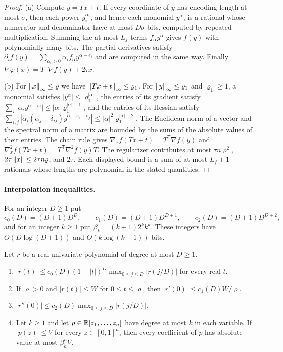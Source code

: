 \begin{proof}
(a) Compute $y=Tx+t$. If every coordinate of $y$ has encoding length at most
$\sigma$, then each power $y_i^{\alpha_i}$, and hence each monomial
$y^\alpha$, is a rational whose numerator and denominator have at most
$D\sigma$ bits, computed by repeated multiplication. Summing the at most
$L_f$ terms $f_\alpha y^\alpha$ gives $f(y)$ with polynomially many bits.
The partial derivatives satisfy
$\partial_if(y)=\sum_{\alpha_i>0}\alpha_if_\alpha y^{\alpha-e_i}$ and are
computed in the same way. Finally
$\nabla\varphi(x)=T^{\mathsf T}\nabla f(y)+2\tau x$.

(b) For $\left\lVert x\right\rVert_\infty\le\varrho$ we have
$\left\lVert Tx+t\right\rVert_\infty\le\varrho_1$. For $\left\lVert y\right\rVert_\infty\le\varrho_1$ and
$\varrho_1\ge1$, a monomial satisfies $|y^\alpha|\le\varrho_1^{|\alpha|}$,
the entries of its gradient satisfy
$\sum_i|\alpha_iy^{\alpha-e_i}|\le|\alpha|\varrho_1^{|\alpha|-1}$, and
the entries of its Hessian satisfy
$\sum_{i,j}|\alpha_i(\alpha_j-\delta_{ij})y^{\alpha-e_i-e_j}|\le
|\alpha|^2\varrho_1^{|\alpha|-2}$. The Euclidean norm of a vector and the
spectral norm of a matrix are bounded by the sums of the absolute values of
their entries. The chain rule gives
$\nabla_x f(Tx+t)=T^{\mathsf T}\nabla f(y)$ and
$\nabla^2_xf(Tx+t)=T^{\mathsf T}\nabla^2f(y)T$. The regularizer contributes
at most $\tau n\varrho^2$, $2\tau\left\lVert x\right\rVert\le2\tau n\varrho$, and $2\tau$.
Each displayed bound is a sum of at most $L_f+1$ rationals whose lengths
are polynomial in the stated quantities.
\end{proof}

\paragraph{Interpolation inequalities.}
For an integer $D\ge1$ put
\[
 c_0(D)=(D+1)D^D,\qquad c_1(D)=(D+1)D^{D+1},\qquad c_2(D)=(D+1)D^{D+2},
\]
and for an integer $k\ge1$ put $\beta_k=(k+1)2^kk^k$. These integers have
$O(D\log(D+1))$ and $O(k\log(k+1))$ bits.

\begin{lemma}[Interpolation]\label{lem:points-interp}
Let $r$ be a real univariate polynomial of degree at most $D\ge1$.
\begin{enumerate}[label=(\alph*)]
\item $|r(t)|\le c_0(D)(1+|t|)^D\max_{0\le j\le D}|r(j/D)|$ for every
real $t$.
\item If $\varrho>0$ and $|r(t)|\le W$ for $0\le t\le\varrho$, then
$|r'(0)|\le c_1(D)W/\varrho$.
\item $|r''(0)|\le c_2(D)\max_{0\le j\le D}|r(j/D)|$.
\item Let $k\ge1$ and let $p\in\mathbb R[z_1,\ldots,z_n]$ have degree at most $k$
in each variable. If $|p(z)|\le V$ for every $z\in[0,1]^n$, then every
coefficient of $p$ has absolute value at most $\beta_k^nV$.
\end{enumerate}
\end{lemma}

